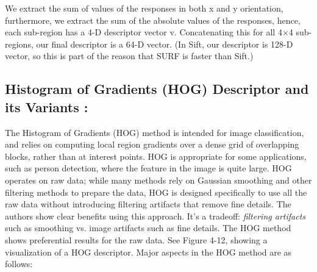 We extract the sum of values of the responses in both x and y orientation, furthermore, we extract the sum of the absolute values of the responses, hence, each sub-region has a 4-D descriptor vector v. Concatenating this for all 4$\times$4 sub-regions, our final descriptor is a 64-D vector. (In Sift, our descriptor is 128-D vector, so this is part of the reason that SURF is faster than Sift.)


\subsection{Histogram of Gradients (HOG) Descriptor  and its Variants :}

The Histogram of Gradients (HOG) method \cite{g} is intended for image classification,
and relies on computing local region gradients over a dense grid of overlapping blocks,
rather than at interest points. HOG is appropriate for some applications, such as person
detection, where the feature in the image is quite large.
HOG operates on raw data; while many methods rely on Gaussian smoothing and
other filtering methods to prepare the data, HOG is designed specifically to use all the
raw data without introducing filtering artifacts that remove fine details. The authors show
clear benefits using this approach. It’s a tradeoff: \textit{filtering artifacts} such as smoothing vs.
image artifacts such as fine details. The HOG method shows preferential results for the
raw data. See Figure 4-12, showing a visualization of a HOG descriptor.
Major aspects in the HOG method are as follows:

